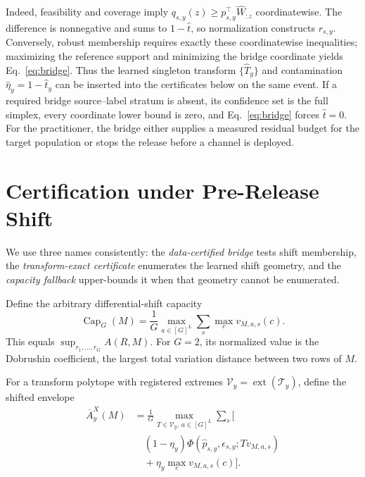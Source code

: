 Indeed, feasibility and coverage imply
$q_{s,y}(z)\geq p_{s,y}^{\top}\widehat W_{:z}$ coordinatewise. The difference is
nonnegative and sums to $1-\widehat t$, so normalization constructs
$r_{s,y}$. Conversely, robust membership requires exactly these coordinatewise
inequalities; maximizing the reference support and minimizing the bridge
coordinate yields Eq.~\eqref{eq:bridge}. Thus the learned singleton transform
$\{\widehat T_y\}$ and contamination
$\widehat\eta_y=1-\widehat t_y$ can be inserted into the certificates below on
the same event. If a required bridge source--label stratum is absent, its
confidence set is the full simplex, every coordinate lower bound is zero, and
Eq.~\eqref{eq:bridge} forces $\widehat t=0$.
For the practitioner, the bridge either supplies a measured residual budget for
the target population or stops the release before a channel is deployed.

\section{Certification under Pre-Release Shift}

We use three names consistently: the \emph{data-certified bridge} tests shift
membership, the \emph{transform-exact certificate} enumerates the learned shift
geometry, and the \emph{capacity fallback} upper-bounds it when that geometry
cannot be enumerated.

Define the arbitrary differential-shift capacity
\begin{equation}
 \operatorname{Cap}_G(M)=\frac{1}{G}\max_{a\in[G]^L}
 \sum_s\max_c v_{M,a,s}(c).
 \label{eq:capacity}
\end{equation}
This equals $\sup_{r_1,\ldots,r_G}A(R,M)$. For $G=2$, its normalized value is
the Dobrushin coefficient, the largest total variation distance between two
rows of $M$.

For a transform polytope with registered extremes
$\mathcal V_y=\operatorname{ext}(\mathcal T_y)$, define the shifted envelope
\begin{equation}
 \begin{aligned}
 \overline A_y^X(M)
 &=\frac1G\max_{T\in\mathcal V_y,\,a\in[G]^L}\sum_s\Big[
 \\[-2pt]&\quad (1-\eta_y)
 \Phi(\widehat p_{s,y},\epsilon_{s,y};Tv_{M,a,s})
 \\[-2pt]&\quad +\eta_y\max_cv_{M,a,s}(c)\Big].
 \end{aligned}
 \label{eq:exactshift}
\end{equation}

